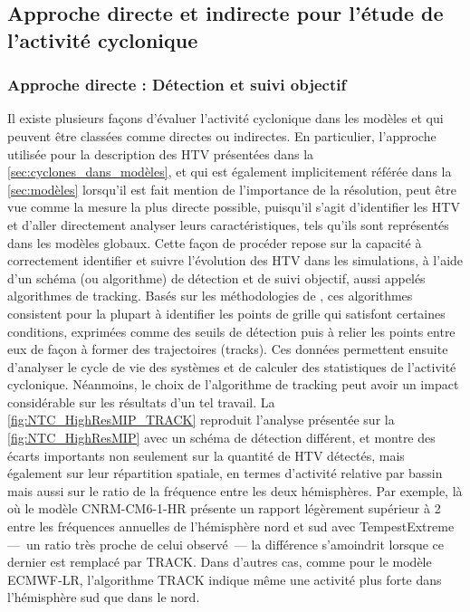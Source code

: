 \documentclass[../main.tex]{subfiles}
\begin{document}
\subsection{Approche directe et indirecte pour l'étude de l'activité cyclonique}\label{sec:tracking_vs_indices}

\subsubsection{Approche directe : Détection et suivi objectif}\label{sec:intro_tracking}

Il existe plusieurs façons d'évaluer l'activité cyclonique dans les modèles et qui peuvent être classées comme directes ou indirectes. En particulier,
l'approche utilisée pour la description des HTV présentées dans la \cref{sec:cyclones_dans_modèles}, et qui est également implicitement référée dans la
\cref{sec:modèles} lorsqu'il est fait mention de l'importance de la résolution, peut être vue comme la mesure la plus directe possible, puisqu'il s'agit
d'identifier les HTV et d'aller directement analyser leurs caractéristiques, tels qu'ils sont représentés dans les modèles globaux. Cette façon de procéder
repose sur la capacité à correctement identifier et suivre l'évolution des HTV dans les simulations, à l'aide d'un schéma (ou algorithme) de détection et de
suivi objectif, aussi appelés algorithmes de tracking. Basés sur les méthodologies de \cite{haarsma_tropical_1993,bengtsson_hurricanetype_1995}, ces algorithmes
consistent pour la plupart à identifier les points de grille qui satisfont certaines conditions, exprimées comme des seuils de détection puis à relier les
points entre eux de façon à former des trajectoires (tracks). Ces données permettent ensuite d'analyser le cycle de vie des systèmes et de calculer des
statistiques de l'activité cyclonique. Néanmoins, le choix de l'algorithme de tracking peut avoir un impact considérable sur les résultats d'un tel travail. La
\cref{fig:NTC_HighResMIP_TRACK} reproduit l'analyse présentée sur la \cref{fig:NTC_HighResMIP} avec un schéma de détection différent, et montre des écarts
importants non seulement sur la quantité de HTV détectés, mais également sur leur répartition spatiale, en termes d'activité relative par bassin mais aussi sur
le ratio de la fréquence entre les deux hémisphères. Par exemple, là où le modèle CNRM-CM6-1-HR présente un rapport légèrement supérieur à \num{2} entre les
fréquences annuelles de l'hémisphère nord et sud avec TempestExtreme ---~un ratio très proche de celui observé~--- la différence s'amoindrit lorsque ce dernier
est remplacé par TRACK. Dans d'autres cas, comme pour le modèle ECMWF-LR, l'algorithme TRACK indique même une activité plus forte dans l'hémisphère sud que dans
le nord.
\end{document}

